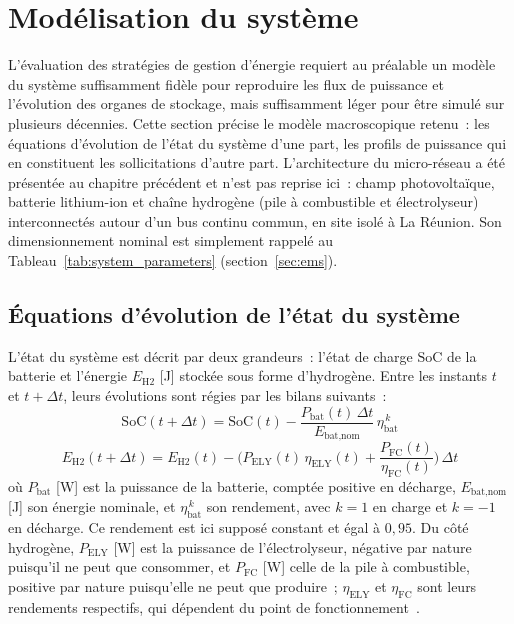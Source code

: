
\section{Modélisation du système}
\label{sec:modele}

L'évaluation des stratégies de gestion d'énergie requiert au préalable un modèle du système suffisamment fidèle pour reproduire les flux de puissance et l'évolution des organes de stockage, mais suffisamment léger pour être simulé sur plusieurs décennies. Cette section précise le modèle macroscopique retenu~: les équations d'évolution de l'état du système d'une part, les profils de puissance qui en constituent les sollicitations d'autre part. L'architecture du micro-réseau a été présentée au chapitre précédent et n'est pas reprise ici~: champ photovoltaïque, batterie lithium-ion et chaîne hydrogène (pile à combustible et électrolyseur) interconnectés autour d'un bus continu commun, en site isolé à La Réunion. Son dimensionnement nominal est simplement rappelé au Tableau~\ref{tab:system_parameters} (section~\ref{sec:ems}).

\subsection{Équations d'évolution de l'état du système}
\label{subsec:eqs_evolution}

L'état du système est décrit par deux grandeurs~: l'état de charge $\mathrm{SoC}$ de la batterie et l'énergie $E_{\text{H2}}$ [J] stockée sous forme d'hydrogène. Entre les instants $t$ et $t+\Delta t$, leurs évolutions sont régies par les bilans suivants~:
\begin{equation}
    \label{eq:soc_evol_sys}
    \mathrm{SoC}(t+\Delta t) = \mathrm{SoC}(t) - \frac{P_{\text{bat}}(t)\,\Delta t}{E_{\text{bat,nom}}}\,\eta_{\text{bat}}^{\,k}
\end{equation}
\begin{equation}
    \label{eq:eh2_evol_sys}
    E_{\text{H2}}(t+\Delta t) = E_{\text{H2}}(t) - \Big( P_{\text{ELY}}(t)\,\eta_{\text{ELY}}(t) + \frac{P_{\text{FC}}(t)}{\eta_{\text{FC}}(t)} \Big)\,\Delta t
\end{equation}
où $P_{\text{bat}}$ [W] est la puissance de la batterie, comptée positive en décharge, $E_{\text{bat,nom}}$ [J] son énergie nominale, et $\eta_{\text{bat}}^{\,k}$ son rendement, avec $k=1$ en charge et $k=-1$ en décharge. Ce rendement est ici supposé constant et égal à $0{,}95$. Du côté hydrogène, $P_{\text{ELY}}$ [W] est la puissance de l'électrolyseur, négative par nature puisqu'il ne peut que consommer, et $P_{\text{FC}}$ [W] celle de la pile à combustible, positive par nature puisqu'elle ne peut que produire~; $\eta_{\text{ELY}}$ et $\eta_{\text{FC}}$ sont leurs rendements respectifs, qui dépendent du point de fonctionnement~\cite{lu_optimization_2023}\cite{jia_novel_2023}.

